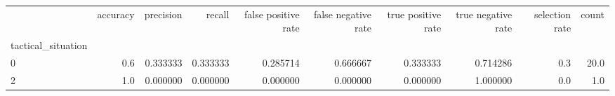 \begin{tabular}{lrrrrrrrrr}
\toprule
{} &  accuracy &  precision &    recall &  false positive rate &  false negative rate &  true positive rate &  true negative rate &  selection rate &  count \\
tactical\_situation &           &            &           &                      &                      &                     &                     &                 &        \\
\midrule
0                  &       0.6 &   0.333333 &  0.333333 &             0.285714 &             0.666667 &            0.333333 &            0.714286 &             0.3 &   20.0 \\
2                  &       1.0 &   0.000000 &  0.000000 &             0.000000 &             0.000000 &            0.000000 &            1.000000 &             0.0 &    1.0 \\
\bottomrule
\end{tabular}
